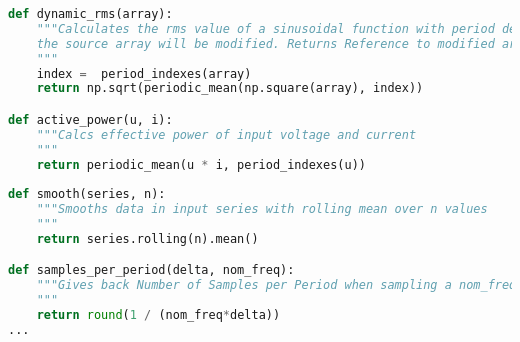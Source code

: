 \begin{lstlisting}[language=python, caption=Auszug aus \texttt{preprocessData.py}, label=lst:PreprocessData]
def dynamic_rms(array):
    """Calculates the rms value of a sinusoidal function with period detection by zero crossing **in place**, that means,
    the source array will be modified. Returns Reference to modified array.
    """
    index =  period_indexes(array)
    return np.sqrt(periodic_mean(np.square(array), index))

def active_power(u, i):
    """Calcs effective power of input voltage and current
    """
    return periodic_mean(u * i, period_indexes(u))
    
def smooth(series, n):
    """Smooths data in input series with rolling mean over n values
    """
    return series.rolling(n).mean()

def samples_per_period(delta, nom_freq):
    """Gives back Number of Samples per Period when sampling a nom_freq signal with delta 
    """
    return round(1 / (nom_freq*delta))
...
\end{lstlisting}

